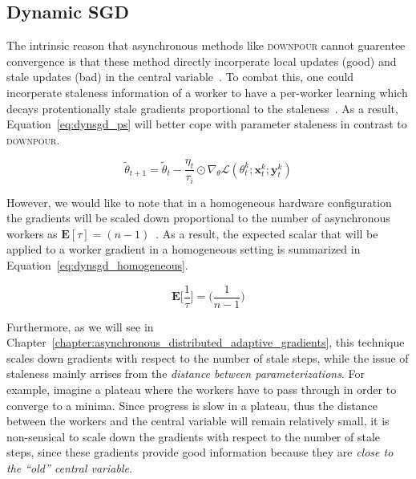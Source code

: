 \subsection{Dynamic SGD}
\label{sec:dyn_sgd}

The intrinsic reason that asynchronous methods like \textsc{downpour} cannot guarentee convergence is that these method directly incorperate local updates (good) and stale updates (bad) in the central variable~\cite{jiang2017heterogeneity}. To combat this, one could incorperate staleness information of a worker to have a per-worker learning which decays protentionally stale gradients proportional to the staleness~\cite{jiang2017heterogeneity}. As a result, Equation~\ref{eq:dynsgd_ps} will better cope with parameter staleness in contrast to \textsc{downpour}.

\begin{equation}
  \label{eq:dynsgd_ps}
  \tilde{\theta}_{t+1} = \tilde{\theta}_t - \frac{\eta_t}{\tau_i} \odot \nabla_\theta \mathcal{L}(\theta^k_t;\mathbf{x}^k_t;\mathbf{y}^k_t)
\end{equation}

However, we would like to note that in a homogeneous hardware configuration the gradients will be scaled down proportional to the number of asynchronous workers as $\mathbf{E}[\tau] = (n - 1)$~\cite{implicitmomentum}. As a result, the expected scalar that will be applied to a worker gradient in a homogeneous setting is summarized in Equation~\ref{eq:dynsgd_homogeneous}.

\begin{equation}
  \label{eq:dynsgd_homogeneous}
  \mathbf{E}\Bigg[\frac{1}{\tau}\Bigg] = \Bigg(\frac{1}{n - 1}\Bigg)
\end{equation}

Furthermore, as we will see in Chapter~\ref{chapter:asynchronous_distributed_adaptive_gradients}, this technique scales down gradients with respect to the number of stale steps, while the issue of staleness mainly arrises from the \emph{distance between parameterizations}. For example, imagine a plateau where the workers have to pass through in order to converge to a minima. Since progress is slow in a plateau, thus the distance between the workers and the central variable will remain relatively small, it is non-sensical to scale down the gradients with respect to the number of stale steps, since these gradients provide good information because they are \emph{close to the ``old'' central variable}.\\

